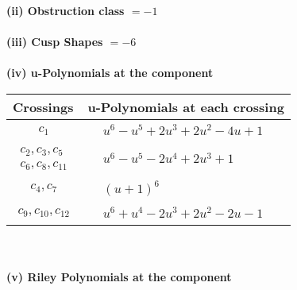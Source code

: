 \documentclass[1p]{elsarticle_modified}
\theoremstyle{definition}
\begin{document}
\flushleft \textbf{(ii) Obstruction class $= -1$}\\~\\
\flushleft \textbf{(iii) Cusp Shapes $= -6$}\\~\\
\newpage\renewcommand{\arraystretch}{1}
\flushleft \textbf{(iv) u-Polynomials at the component}\newline \\
\begin{tabular}{m{50pt}|m{274pt}}
Crossings & \hspace{64pt}u-Polynomials at each crossing \\
\hline $$\begin{aligned}c_{1}\end{aligned}$$&$\begin{aligned}
&u^6- u^5+2 u^3+2 u^2-4 u+1
\end{aligned}$\\
\hline $$\begin{aligned}c_{2},c_{3},c_{5}\\c_{6},c_{8},c_{11}\end{aligned}$$&$\begin{aligned}
&u^6- u^5-2 u^4+2 u^3+1
\end{aligned}$\\
\hline $$\begin{aligned}c_{4},c_{7}\end{aligned}$$&$\begin{aligned}
&(u+1)^6
\end{aligned}$\\
\hline $$\begin{aligned}c_{9},c_{10},c_{12}\end{aligned}$$&$\begin{aligned}
&u^6+u^4-2 u^3+2 u^2-2 u-1
\end{aligned}$\\
\hline
\end{tabular}\\~\\
\newpage\renewcommand{\arraystretch}{1}
\flushleft \textbf{(v) Riley Polynomials at the component}\newline \\
\end{document}

